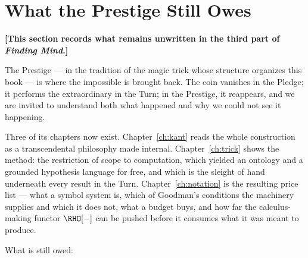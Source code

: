 \chapter*{What the Prestige Still Owes}

\noindent\textbf{[This section records what remains unwritten in the
third part of \emph{Finding Mind}.]}

\bigskip

The Prestige --- in the tradition of the magic trick whose structure
organizes this book --- is where the impossible is brought back. The
coin vanishes in the Pledge; it performs the extraordinary in the
Turn; in the Prestige, it reappears, and we are invited to understand
both what happened and why we could not see it happening.

Three of its chapters now exist.
Chapter~\ref{ch:kant} reads the whole construction as a
transcendental philosophy made internal.
Chapter~\ref{ch:trick} shows the method: the restriction of scope to
computation, which yielded an ontology and a grounded hypothesis
language for free, and which is the sleight of hand underneath every
result in the Turn.
Chapter~\ref{ch:notation} is the resulting price list --- what a
symbol system is, which of Goodman's conditions the machinery
supplies and which it does not, what a budget buys, and how far the
calculus-making functor $\RHO[-]$ can be pushed before it consumes
what it was meant to produce.

\bigskip

What is still owed:

